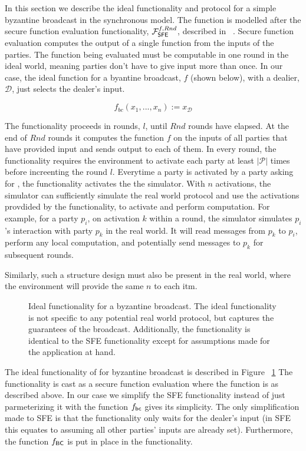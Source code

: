 In this section we describe the ideal functionality and protocol for a simple byzantine broadcast in the synchronous model.
The function is modelled after the secure function evaluation functionality, $\mathcal{F}_{{\mathsf {SFE}}}^{f,Rnd}$, described in ~\cite{katz-clock}.
Secure function evaluation computes the output of a single function from the inputs of the parties.
The function being evaluated must be computable in one round in the ideal world, meaning parties don't have to give input more than once.
In our case, the ideal function for a byantine broadcast, $f$ (shown below), with a dealier, $\mathcal{D}$, just selects the dealer's input.

\[ f_{bc}(x_1,...,x_n) := x_{\mathcal{D}} \]

The functionality proceeds in rounds, $l$, until $Rnd$ rounds have elapsed.
At the end of $Rnd$ rounds it computes the function $f$ on the inputs of all parties that have provided input and sends output to each of them.
In every round, the functionality requires the environment to activate each party at least $|\mathcal{P}|$ times before increenting the round $l$. 
Everytime a party is activated by a party asking for , the functionality activates the the simulator.
With $n$ activations, the simulator can sufficiently simulate the real world protocol and use the activations provdided by the functionality, to activate and perform computation.
For example, for a party $p_i$, on activation $k$ within a round, the simulator simulates $p_i$'s interaction with party $p_k$ in the real world.
It will read messages from $p_k$ to $p_i$, perform any local computation, and potentially send messages to $p_k$ for subsequent rounds.

Similarly, such a structure design must also be present in the real world, where the environment will provide the same $n$  to each itm.

\begin{figure}[!h]
	
	\label{fig:functionality:broadcast}
	\caption{Ideal functionality for a byzantine broadcast. The ideal functionality is not specific to any potential real world protocol, but captures the guarantees of the broadcast. Additionally, the functionality is identical to the SFE functionality except for assumptions made for the application at hand.}
\end{figure}

The ideal functionality of for byzantine broadcast is described in Figure ~\ref{fig:functionality:broadcast}
The functionality is cast as a secure function evaluation where the function is as described above.
In our case we simplify the SFE functionality instead of just parmeterizing it with the function $f_{{\mathsf {bc}}}$ gives its simplicity.
The only simplification made to SFE is that the functionality only waits for the dealer's input (in SFE this equates to assuming all other parties' inputs are already set).
Furthermore, the function $f_{{\mathsf {BC}}}$ is put in place in the functionality.


